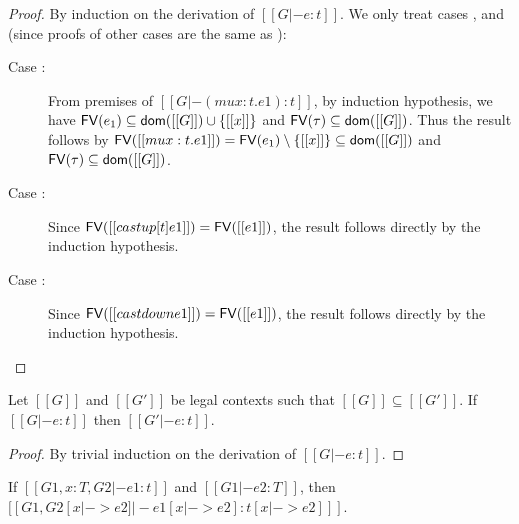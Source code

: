 \begin{proof}
    By induction on the derivation of $[[G |- e:t]]$. We only treat cases ,  and  (since proofs of other cases are the same as \cc \cite{handbook}):
    \begin{description}
        \item[Case :] From premises of $[[G |- (mu x:t.e1) : t]]$, by induction hypothesis, we have $\mathsf{FV}(e_1) \subseteq \mathsf{dom}([[G]]) \cup \{[[x]]\}$ and $\mathsf{FV}(\tau) \subseteq \mathsf{dom}([[G]])$. Thus the result follows by $\mathsf{FV}([[mu x:t.e1]])=\mathsf{FV}(e_1) \setminus \{[[x]]\} \subseteq \mathsf{dom}([[G]])$ and $\mathsf{FV}(\tau) \subseteq \mathsf{dom}([[G]])$.
        \item[Case :] Since $\mathsf{FV}([[castup [t] e1]])=\mathsf{FV}([[e1]])$, the result follows directly by the induction hypothesis.
        \item[Case :] Since $\mathsf{FV}([[castdown e1]])=\mathsf{FV}([[e1]])$, the result follows directly by the induction hypothesis.
    \end{description}
\end{proof}

\begin{lem}\label{lem:appendix:thin}
    Let $[[G]]$ and $[[G']]$ be legal contexts such that $[[G]] \subseteq [[G']]$. If $[[G |- e : t]]$ then $[[G' |- e : t]]$.
\end{lem}

\begin{proof}
    By trivial induction on the derivation of $[[G |- e : t]]$.
\end{proof}

\begin{lem}\label{lem:appendix:subst}
	If $[[G1, x:T, G2 |- e1:t]]$ and $[[G1 |- e2:T]]$, then $[[G1, G2 [x |-> e2] |- e1[x |-> e2]  : t[x |-> e2] ]]$.
\end{lem}

